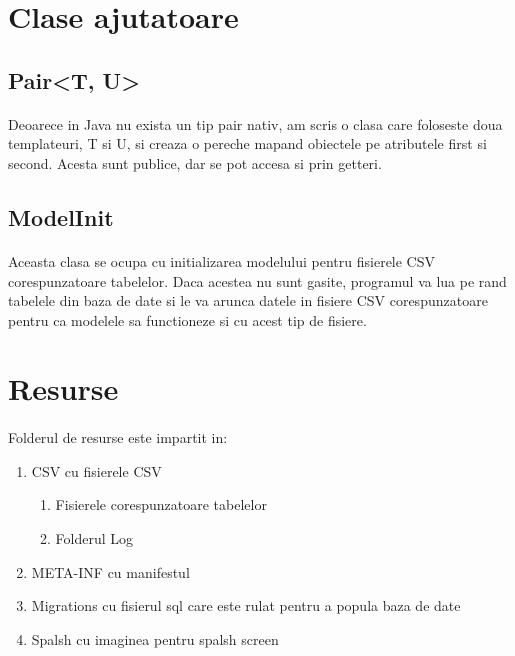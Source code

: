 \documentclass[oneside]{article}
\begin{document}
\section[Clase ajutatoare]{Clase ajutatoare}
\subsection[Pair<T, U>]{Pair<T, U>}
\paragraph{} Deoarece in Java nu exista un tip pair nativ, am scris o clasa care foloseste doua templateuri, T si U, si creaza o pereche mapand obiectele pe atributele first si second. Acesta sunt publice, dar se pot accesa si prin getteri.

\subsection[ModelInit]{ModelInit}
\paragraph{} Aceasta clasa se ocupa cu initializarea modelului pentru fisierele CSV corespunzatoare tabelelor. Daca acestea nu sunt gasite, programul va lua pe rand tabelele din baza de date si le va arunca datele in fisiere CSV corespunzatoare pentru ca modelele sa functioneze si cu acest tip de fisiere.

\section[Resurse]{Resurse}
\paragraph{}Folderul de resurse este impartit in:
\begin{enumerate}
    \item CSV cu fisierele CSV
    \begin{enumerate}
        \item Fisierele corespunzatoare tabelelor
        \item Folderul Log
    \end{enumerate}
    \item META-INF cu manifestul
    \item Migrations cu fisierul sql care este rulat pentru a popula baza de date
    \item Spalsh cu imaginea pentru spalsh screen
\end{enumerate}
\end{document}
